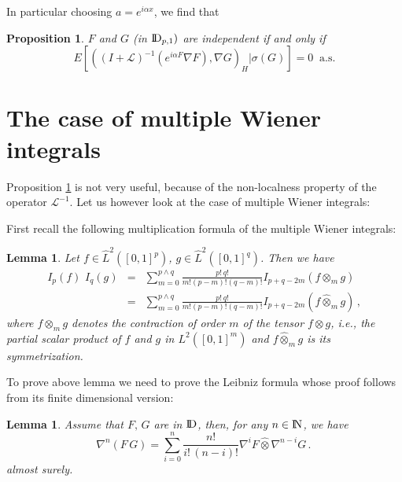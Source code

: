 \documentclass[12pt,a4paper]{book}
\newtheorem{lemma}[theorem]{Lemma}
\newtheorem{proposition}[theorem]{Proposition}
\newcommand{\beaa}{\begin{eqnarray*}}
\newcommand{\eeaa}{\end{eqnarray*}}
\newcommand{\NN}{{\rm I\!N}}
\newcommand{\DD}{{\rm I\!D}}
\begin{document}
\noindent
In particular choosing  $a=e^{i\alpha x}$, we find that

\begin{proposition}
\label{ind-char}
$F$ and $G$ (in $\DD_{p,1})$ are independent if and only if
$$
E\left[((I+{\mathcal L})^{-1}(e^{i\alpha F}
      \nabla F),\nabla G)_H\Big|\sigma(G)\right]=0\;\;{\mbox{a.s.}}
$$
\end{proposition}
\section{The case of multiple Wiener integrals}
Proposition \ref{ind-char}  is not very useful,  because of the non-localness
property of the operator ${\mathcal L}^{-1}$. Let us however look at the case
of multiple Wiener integrals:

First recall the following multiplication formula
 of the multiple Wiener
integrals:

\begin{lemma}
\label{mult-lemma}
Let $f\in\hat{L}^2([0,1]^p)$, $g\in\hat{L}^2([0,1]^q)$. Then we have
\beaa
I_p(f)\,\, I_q(g)&=&\sum_{m=0}^{p\wedge q} \frac{p!\,q!}{m!(p-m)!(q-m)!}
I_{p+q-2m}(f\otimes_m g)\\
&=&\sum_{m=0}^{p\wedge q} \frac{p!\,q!}{m!(p-m)!(q-m)!}
I_{p+q-2m}(f\hat{\otimes}_m g)\,,
\eeaa
where $f\otimes_m g$ denotes the
contraction  of  order $m$ of the tensor 
$f\otimes g$, i.e., the partial scalar product of $f$ and $g$ in
$L^2([0,1]^m)$ and $f\hat{\otimes}_m g$ is its symmetrization.
\end{lemma}

\noindent
To prove above lemma we need to prove the Leibniz formula whose proof
follows from its finite dimensional version:
\begin{lemma}
\label{Leibniz}
Assume that $F, \,G$ are in $\DD$, then, for any $n\in \NN$,
we have 
$$
\nabla^n(F\,G)=\sum_{i=0}^n \frac{n!}{i!\,(n-i)!}\nabla^i
F\hat{\otimes}\nabla^{n-i}G\,.\,
$$
almost surely.
\end{lemma}
\end{document}
